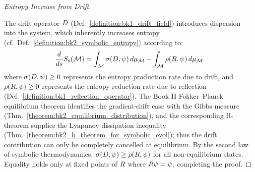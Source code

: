 \begin{proof}[Entropy Increase from Drift]
\label{proof:bk5_entropy_increase_from_drift}
\leavevmode

The drift operator $D$ (Def.~\ref{definition:bk1_drift_field}) introduces dispersion into the system, which inherently increases entropy (cf.~Def.~\ref{definition:bk2_symbolic_entropy}) according to:
\begin{equation}
\frac{d}{ds} S_s(\mathcal{M}) = \int_{\mathcal{M}} \sigma(D, \psi) \, d\mu_{\mathcal{M}} - \int_{\mathcal{M}} \rho(R, \psi) \, d\mu_{\mathcal{M}}
\end{equation}
\noindent where $\sigma(D, \psi) \geq 0$ represents the entropy production rate due to drift, and $\rho(R, \psi) \geq 0$ represents the entropy reduction rate due to reflection (Def.~\ref{definition:bk1_reflection_operator}).
The Book II Fokker--Planck equilibrium theorem identifies the gradient-drift
case with the Gibbs measure (Thm.~\ref{theorem:bk2_equilibrium_distribution}),
and the corresponding H-theorem supplies the Lyapunov dissipation inequality
(Thm.~\ref{theorem:bk2_h_theorem_for_symbolic_evol}); thus the drift
contribution can only be completely cancelled at equilibrium.
By the second law of symbolic thermodynamics, $\sigma(D, \psi) \geq \rho(R, \psi)$ for all non-equilibrium states. Equality holds only at fixed points of $R$ where $R\psi = \psi$, completing the proof.
\end{proof}

